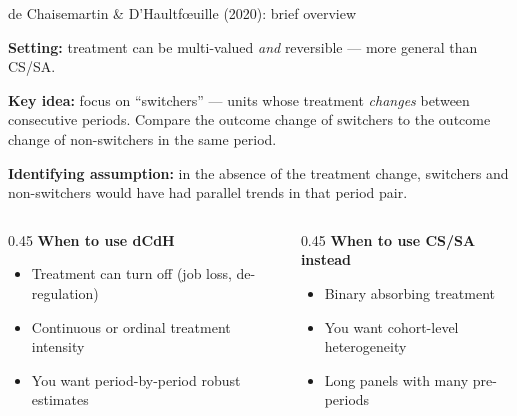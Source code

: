 \documentclass[aspectratio=169, 10pt]{beamer}
\begin{document}
\begin{frame}{de Chaisemartin \& D'Haultf\oe{}uille (2020): brief overview}

  \textbf{Setting:} treatment can be multi-valued \emph{and} reversible — more general than CS/SA.

  \medskip
  \textbf{Key idea:} focus on ``switchers'' — units whose treatment \emph{changes} between consecutive periods.
  Compare the outcome change of switchers to the outcome change of non-switchers in the same period.

  \medskip
  \textbf{Identifying assumption:} in the absence of the treatment change, switchers and non-switchers
  would have had parallel trends in that period pair.

  \medskip
  \begin{columns}[T]
    \begin{column}{0.45\textwidth}
      \textbf{When to use dCdH}
      \begin{itemize}
        \item Treatment can turn off (job loss, de-regulation)
        \item Continuous or ordinal treatment intensity
        \item You want period-by-period robust estimates
      \end{itemize}
    \end{column}
    \begin{column}{0.45\textwidth}
      \textbf{When to use CS/SA instead}
      \begin{itemize}
        \item Binary absorbing treatment
        \item You want cohort-level heterogeneity
        \item Long panels with many pre-periods
      \end{itemize}
    \end{column}
  \end{columns}

\end{frame}
\end{document}

